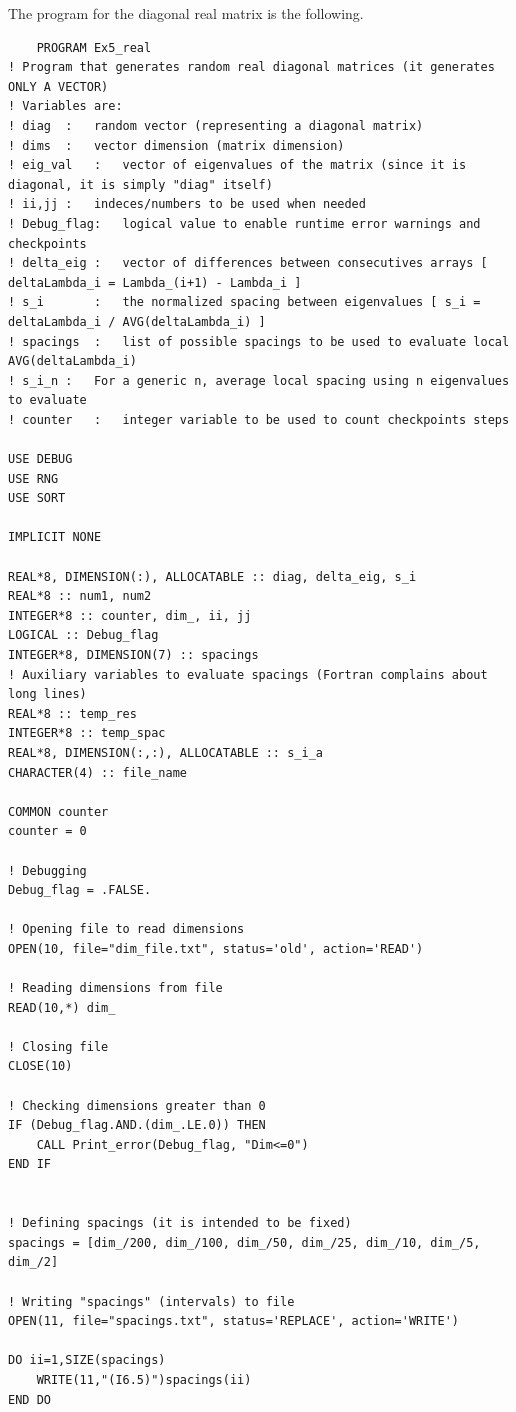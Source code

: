 \documentclass[12pt, a4paper, notitlepage]{report}
\begin{document}
The program for the diagonal real matrix is the following.

\begin{lstlisting}
	PROGRAM Ex5_real
! Program that generates random real diagonal matrices (it generates ONLY A VECTOR)
! Variables are:
! diag	:	random vector (representing a diagonal matrix)
! dims	:	vector dimension (matrix dimension)
! eig_val	:	vector of eigenvalues of the matrix (since it is diagonal, it is simply "diag" itself)
! ii,jj	:	indeces/numbers to be used when needed
! Debug_flag:	logical value to enable runtime error warnings and checkpoints
! delta_eig	:	vector of differences between consecutives arrays [ deltaLambda_i = Lambda_(i+1) - Lambda_i ]
! s_i		:	the normalized spacing between eigenvalues [ s_i = deltaLambda_i / AVG(deltaLambda_i) ]
! spacings	:	list of possible spacings to be used to evaluate local AVG(deltaLambda_i)
! s_i_n	:	For a generic n, average local spacing using n eigenvalues to evaluate
! counter	:	integer variable to be used to count checkpoints steps

USE DEBUG
USE RNG
USE SORT

IMPLICIT NONE

REAL*8, DIMENSION(:), ALLOCATABLE :: diag, delta_eig, s_i
REAL*8 :: num1, num2
INTEGER*8 :: counter, dim_, ii, jj
LOGICAL :: Debug_flag
INTEGER*8, DIMENSION(7) :: spacings
! Auxiliary variables to evaluate spacings (Fortran complains about long lines)
REAL*8 :: temp_res
INTEGER*8 :: temp_spac
REAL*8, DIMENSION(:,:), ALLOCATABLE :: s_i_a
CHARACTER(4) :: file_name

COMMON counter
counter = 0

! Debugging
Debug_flag = .FALSE.

! Opening file to read dimensions
OPEN(10, file="dim_file.txt", status='old', action='READ')

! Reading dimensions from file
READ(10,*) dim_

! Closing file
CLOSE(10)

! Checking dimensions greater than 0
IF (Debug_flag.AND.(dim_.LE.0)) THEN
	CALL Print_error(Debug_flag, "Dim<=0")
END IF


! Defining spacings (it is intended to be fixed)
spacings = [dim_/200, dim_/100, dim_/50, dim_/25, dim_/10, dim_/5, dim_/2]

! Writing "spacings" (intervals) to file
OPEN(11, file="spacings.txt", status='REPLACE', action='WRITE')

DO ii=1,SIZE(spacings)
	WRITE(11,"(I6.5)")spacings(ii)
END DO


\end{lstlisting}
\end{document}
